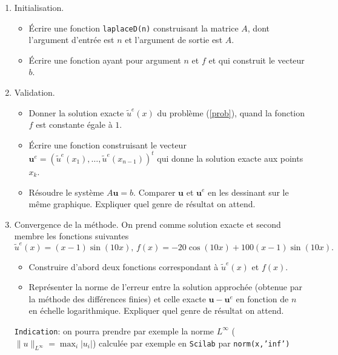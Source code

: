 \documentclass[12pt,a4paper]{article}
\begin{document}
\begin{enumerate}
\item Initialisation.
\begin{itemize}
\item \'Ecrire une fonction \texttt{laplaceD(n)} construisant la matrice $A$, dont l'argument d'entr\'ee est $n$ et l'argument de sortie est $A$.
\item \'Ecrire une fonction ayant pour argument $n$ et $f$ et qui construit le vecteur $b$.
\end{itemize}
\item Validation.
\begin{itemize}
\item Donner la solution exacte $\tilde u^e(x)$ du probl\`eme
  (\ref{prob}), quand la fonction $f$ est constante \'egale \`a $1$. 
\item \'Ecrire une fonction construisant le vecteur $\mathbf{u}^e = (\tilde
  u^e(x_1),\hdots,\tilde u^e(x_{n-1}))^t$  qui donne la solution
  exacte aux points $x_k$. 
\item R\'esoudre le syst\`eme $A \mathbf{u} =
  b$. Comparer $\mathbf{u}$ et $\mathbf{u}^e$ en les dessinant sur le
  m\^eme graphique. Expliquer quel genre de r\'esultat on attend.
\end{itemize}
\item Convergence de la m\'ethode. On prend comme solution exacte et
  second membre les fonctions suivantes
$$
\tilde u^e(x)= (x-1)\sin(10x),\,f(x) = -20\cos(10x)+100(x-1)\sin(10x).
$$
\begin{itemize}
\item Construire d'abord deux fonctions correspondant \`a $\tilde u^e(x)$
et $f(x)$. 
\item Repr\'esenter la norme de l'erreur entre la solution
approch\'ee (obtenue par la m\'ethode des diff\'erences finies) et
celle exacte $\mathbf{u} - \mathbf{u}^e$ en fonction de $n$
en \'echelle logarithmique. Expliquer quel genre de r\'esultat on
attend. 
\end{itemize}
\texttt{Indication}: on pourra prendre par exemple la norme
$L^{\infty}$ ($\|u\|_{L^{\infty}} = \max_i |u_i| $) calcul\'ee par
exemple en \texttt{Scilab} par \texttt{norm(x,'inf')}
\end{enumerate}
\end{document}
